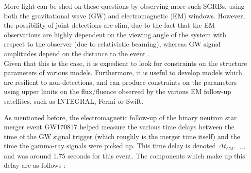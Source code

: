     More light can be shed on these questions by observing more such SGRBs,
    using both the gravitational wave (GW) and electromagnetic (EM) windows.
    However, the possibility of joint detections are slim, due to the fact that
    the EM observations are highly dependent on the viewing angle of the system
    with respect to the observer (due to relativistic beaming), whereas GW
    signal amplitudes depend on the distance to the event
    \cite{saleem_prospects_2020}.\\ Given that this is the case, it is expedient
    to look for constraints on the structure parameters of various models.
    Furthermore, it is useful to develop models which are resilient to
    non-detections, and can produce constraints on the parameters using upper
    limits on the flux/fluence observed by the various EM follow-up satellites,
    such as INTEGRAL, Fermi or Swift.

    As mentioned before, the electromagnetic follow-up of the binary neutron
    star merger event GW170817 helped measure the various time delays between
    the time of the GW signal trigger (which roughly is the merger time itself)
    and the time the gamma-ray signals were picked up. This time delay is
    denoted $\Delta t_{GW-\gamma}$, and was around 1.75 seconds for this event.
    The components which make up this delay are as follows
    \cite{lazzati_short_2020}:

